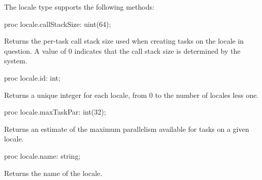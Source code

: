 The locale type supports the following methods:


\begin{protohead}
proc locale.callStackSize: uint(64);
\end{protohead}
\begin{protobody}
Returns the per-task call stack size used when creating tasks on the
locale in question.  A value of 0 indicates that the call stack size
is determined by the system.
\end{protobody}

\begin{protohead}
proc locale.id: int;
\end{protohead}
\begin{protobody}
Returns a unique integer for each locale, from 0 to the number of
locales less one.
\end{protobody}


\begin{protohead}
proc locale.maxTaskPar: int(32);
\end{protohead}
\begin{protobody}
Returns an estimate of the maximum parallelism available for tasks
on a given locale.
\end{protobody}

\pagebreak
{}
\begin{protohead}
proc locale.name: string;
\end{protohead}
\begin{protobody}
Returns the name of the locale.
\end{protobody}

